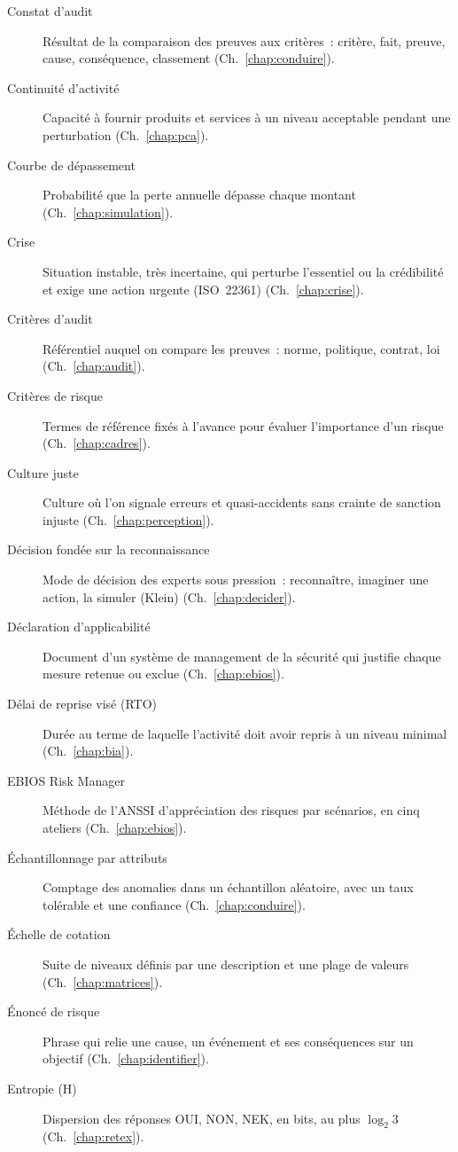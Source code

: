 \begin{description}
    \item[Constat d'audit] Résultat de la comparaison des preuves aux critères~: critère, fait, preuve, cause, conséquence, classement (Ch.~\ref{chap:conduire}).
    \item[Continuité d'activité] Capacité à fournir produits et services à un niveau acceptable pendant une perturbation (Ch.~\ref{chap:pca}).
    \item[Courbe de dépassement] Probabilité que la perte annuelle dépasse chaque montant (Ch.~\ref{chap:simulation}).
    \item[Crise] Situation instable, très incertaine, qui perturbe l'essentiel ou la crédibilité et exige une action urgente (ISO~22361) (Ch.~\ref{chap:crise}).
    \item[Critères d'audit] Référentiel auquel on compare les preuves~: norme, politique, contrat, loi (Ch.~\ref{chap:audit}).
    \item[Critères de risque] Termes de référence fixés à l'avance pour évaluer l'importance d'un risque (Ch.~\ref{chap:cadres}).
    \item[Culture juste] Culture où l'on signale erreurs et quasi-accidents sans crainte de sanction injuste (Ch.~\ref{chap:perception}).
    \item[Décision fondée sur la reconnaissance] Mode de décision des experts sous pression~: reconnaître, imaginer une action, la simuler (Klein) (Ch.~\ref{chap:decider}).
    \item[Déclaration d'applicabilité] Document d'un système de management de la sécurité qui justifie chaque mesure retenue ou exclue (Ch.~\ref{chap:ebios}).
    \item[Délai de reprise visé (RTO)] Durée au terme de laquelle l'activité doit avoir repris à un niveau minimal (Ch.~\ref{chap:bia}).
    \item[EBIOS Risk Manager] Méthode de l'ANSSI d'appréciation des risques par scénarios, en cinq ateliers (Ch.~\ref{chap:ebios}).
    \item[Échantillonnage par attributs] Comptage des anomalies dans un échantillon aléatoire, avec un taux tolérable et une confiance (Ch.~\ref{chap:conduire}).
    \item[Échelle de cotation] Suite de niveaux définis par une description et une plage de valeurs (Ch.~\ref{chap:matrices}).
    \item[Énoncé de risque] Phrase qui relie une cause, un événement et ses conséquences sur un objectif (Ch.~\ref{chap:identifier}).
    \item[Entropie (H)] Dispersion des réponses OUI, NON, NEK, en bits, au plus $\log_2 3$ (Ch.~\ref{chap:retex}).

\end{description}
